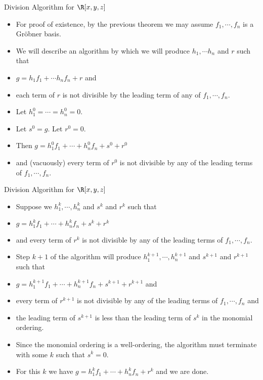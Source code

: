 \documentclass{beamer}
\begin{document}
\begin{frame}{Division Algorithm for $\R[x,y,z]$}

\begin{itemize}
  \item For proof of existence, by the previous theorem we may assume $f_1,\cdots, f_n$ is a Gr\"{o}bner basis.
  \item We will describe an algorithm by which we will produce $h_1,\cdots h_n$ and $r$ such that
  \item $g = h_1 f_1 + \cdots h_n f_n + r$ and
  \item each term of $r$ is not divisible by the leading term of any of $f_1,\cdots,f_n$.
  \item Let $h_1^0 = \cdots = h_n^0 = 0$.
  \item Let $s^0 = g$. Let $r^0 = 0$.
  \item Then $g = h_1^0 f_1 + \cdots + h_n^0 f_n + s^0 + r^0$
  \item and (vacuously) every term of $r^0$ is not divisible by any of the leading terms of $f_1,\cdots, f_n$.
\end{itemize}

\end{frame}

\begin{frame}{Division Algorithm for $\R[x,y,z]$}

\begin{itemize}
  \item Suppose we $h_1^k, \cdots, h_n^k$ and $s^k$ and $r^k$ such that
  \item $g = h_1^k f_1 + \cdots + h_n^k f_n + s^k + r^k$
  \item and every term of $r^k$ is not divisible by any of the leading terms of $f_1,\cdots, f_n$.
  \item Step $k+1$ of the algorithm will produce $h_1^{k+1} , \cdots,  h_n^{k+1}$ and $s^{k+1}$ and $r^{k+1}$ such that
  \item $g = h_1^{k+1} f_1 + \cdots + h_n^{k+1} f_n + s^{k+1} + r^{k+1}$ and
  \item every term of $r^{k+1}$ is not divisible by any of the leading terms of $f_1,\cdots, f_n$ and
  \item the leading term of $s^{k+1}$ is less than the leading term of $s^k$ in the monomial ordering.
  \item Since the monomial ordering is a well-ordering, the algorithm must terminate with some $k$ such that $s^k = 0$.
  \item For this $k$ we have $g = h_1^k f_1 + \cdots + h_n^k f_n + r^k$ and we are done.
\end{itemize}

\end{frame}
\end{document}
